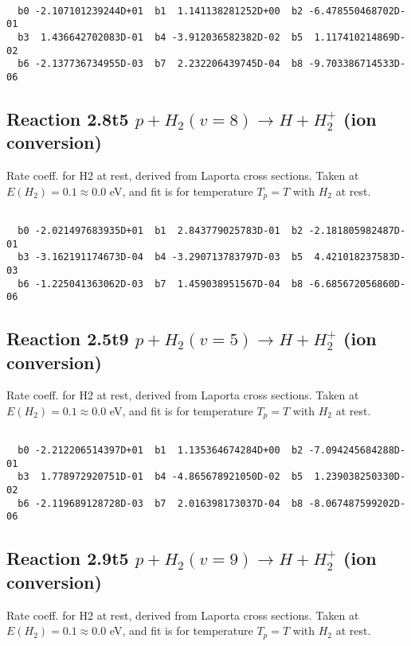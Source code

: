 \begin{small}\begin{verbatim}

  b0 -2.107101239244D+01  b1  1.141138281252D+00  b2 -6.478550468702D-01
  b3  1.436642702083D-01  b4 -3.912036582382D-02  b5  1.117410214869D-02
  b6 -2.137736734955D-03  b7  2.232206439745D-04  b8 -9.703386714533D-06

\end{verbatim}\end{small}

\newpage
\subsection{
Reaction 2.8t5
$ p + H_2(v=8) \rightarrow H + H_2^+$ (ion conversion)
}
Rate coeff. for H2 at rest, derived from Laporta cross sections.
Taken at $E(H_2) = 0.1 \approx 0.0$ eV,  and fit is for temperature $T_p=T$ with $H_2$ at rest.

\begin{small}\begin{verbatim}

  b0 -2.021497683935D+01  b1  2.843779025783D-01  b2 -2.181805982487D-01
  b3 -3.162191174673D-04  b4 -3.290713783797D-03  b5  4.421018237583D-03
  b6 -1.225041363062D-03  b7  1.459038951567D-04  b8 -6.685672056860D-06

\end{verbatim}\end{small}

\newpage
\subsection{
Reaction 2.5t9
$ p + H_2(v=5) \rightarrow H + H_2^+$ (ion conversion)
}
Rate coeff. for H2 at rest, derived from Laporta cross sections.
Taken at $E(H_2) = 0.1 \approx 0.0$ eV,  and fit is for temperature $T_p=T$ with $H_2$ at rest.

\begin{small}\begin{verbatim}

  b0 -2.212206514397D+01  b1  1.135364674284D+00  b2 -7.094245684288D-01
  b3  1.778972920751D-01  b4 -4.865678921050D-02  b5  1.239038250330D-02
  b6 -2.119689128728D-03  b7  2.016398173037D-04  b8 -8.067487599202D-06

\end{verbatim}\end{small}

\newpage
\subsection{
Reaction 2.9t5
$ p + H_2(v=9) \rightarrow H + H_2^+$ (ion conversion)
}
Rate coeff. for H2 at rest, derived from Laporta cross sections.
Taken at $E(H_2) = 0.1 \approx 0.0$ eV,  and fit is for temperature $T_p=T$ with $H_2$ at rest.

